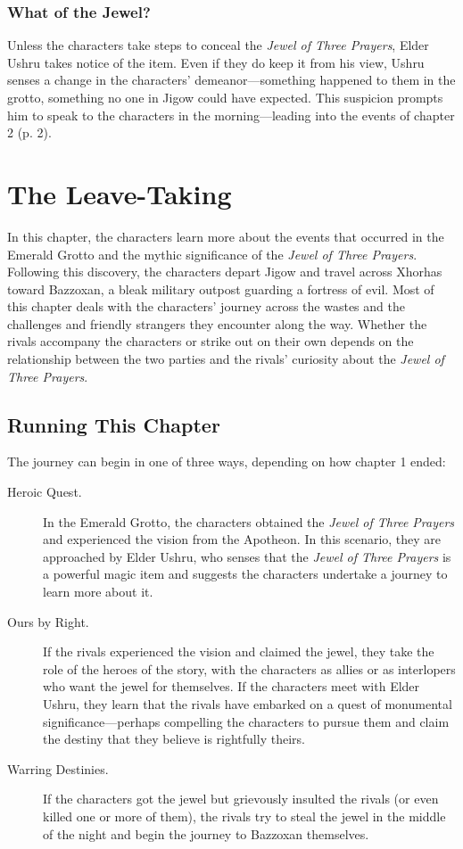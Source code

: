 \documentclass[letterpaper, 11pt, bg=full, twocolumn]{dndbook}
\begin{document}
\subsection{What of the Jewel?}

Unless the characters take steps to conceal the \textit{Jewel of Three Prayers}, Elder Ushru takes notice of the item. Even if they do keep it from his view, Ushru senses a change in the characters' demeanor---something happened to them in the grotto, something no one in Jigow could have expected. This suspicion prompts him to speak to the characters in the morning---leading into the events of chapter 2 (p. 2).

\chapter{The Leave-Taking}\label{ch:the-leave-taking-3-3}

In this chapter, the characters learn more about the events that occurred in the Emerald Grotto and the mythic significance of the \textit{Jewel of Three Prayers}. Following this discovery, the characters depart Jigow and travel across Xhorhas toward Bazzoxan, a bleak military outpost guarding a fortress of evil.
Most of this chapter deals with the characters' journey across the wastes and the challenges and friendly strangers they encounter along the way. Whether the rivals accompany the characters or strike out on their own depends on the relationship between the two parties and the rivals' curiosity about the \textit{Jewel of Three Prayers}.
\section{Running This Chapter}

The journey can begin in one of three ways, depending on how chapter 1 ended:

\begin{description}
\item[Heroic Quest.] In the Emerald Grotto, the characters obtained the \textit{Jewel of Three Prayers} and experienced the vision from the Apotheon. In this scenario, they are approached by Elder Ushru, who senses that the \textit{Jewel of Three Prayers} is a powerful magic item and suggests the characters undertake a journey to learn more about it.
\item[Ours by Right.] If the rivals experienced the vision and claimed the jewel, they take the role of the heroes of the story, with the characters as allies or as interlopers who want the jewel for themselves. If the characters meet with Elder Ushru, they learn that the rivals have embarked on a quest of monumental significance---perhaps compelling the characters to pursue them and claim the destiny that they believe is rightfully theirs.
\item[Warring Destinies.] If the characters got the jewel but grievously insulted the rivals (or even killed one or more of them), the rivals try to steal the jewel in the middle of the night and begin the journey to Bazzoxan themselves.
\end{description}
\end{document}
